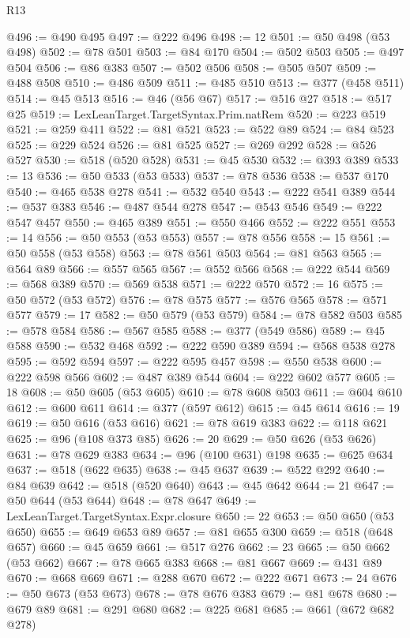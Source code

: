\begin{lexlean}{R13}
\begin{coremodule}
@496 := @490 @495
@497 := @222 @496
@498 := 12
@501 := @50 @498 (@53 @498)
@502 := @78 @501
@503 := @84 @170
@504 := @502 @503
@505 := @497 @504
@506 := @86 @383
@507 := @502 @506
@508 := @505 @507
@509 := @488 @508
@510 := @486 @509
@511 := @485 @510
@513 := @377 (@458 @511)
@514 := @45 @513
@516 := @46 (@56 @67)
@517 := @516 @27
@518 := @517 @25
@519 := LexLeanTarget.TargetSyntax.Prim.natRem
@520 := @223 @519
@521 := @259 @411
@522 := @81 @521
@523 := @522 @89
@524 := @84 @523
@525 := @229 @524
@526 := @81 @525
@527 := @269 @292
@528 := @526 @527
@530 := @518 (@520 @528)
@531 := @45 @530
@532 := @393 @389
@533 := 13
@536 := @50 @533 (@53 @533)
@537 := @78 @536
@538 := @537 @170
@540 := @465 @538 @278
@541 := @532 @540
@543 := @222 @541 @389
@544 := @537 @383
@546 := @487 @544 @278
@547 := @543 @546
@549 := @222 @547 @457
@550 := @465 @389
@551 := @550 @466
@552 := @222 @551
@553 := 14
@556 := @50 @553 (@53 @553)
@557 := @78 @556
@558 := 15
@561 := @50 @558 (@53 @558)
@563 := @78 @561 @503
@564 := @81 @563
@565 := @564 @89
@566 := @557 @565
@567 := @552 @566
@568 := @222 @544
@569 := @568 @389
@570 := @569 @538
@571 := @222 @570
@572 := 16
@575 := @50 @572 (@53 @572)
@576 := @78 @575
@577 := @576 @565
@578 := @571 @577
@579 := 17
@582 := @50 @579 (@53 @579)
@584 := @78 @582 @503
@585 := @578 @584
@586 := @567 @585
@588 := @377 (@549 @586)
@589 := @45 @588
@590 := @532 @468
@592 := @222 @590 @389
@594 := @568 @538 @278
@595 := @592 @594
@597 := @222 @595 @457
@598 := @550 @538
@600 := @222 @598 @566
@602 := @487 @389 @544
@604 := @222 @602 @577
@605 := 18
@608 := @50 @605 (@53 @605)
@610 := @78 @608 @503
@611 := @604 @610
@612 := @600 @611
@614 := @377 (@597 @612)
@615 := @45 @614
@616 := 19
@619 := @50 @616 (@53 @616)
@621 := @78 @619 @383
@622 := @118 @621
@625 := @96 (@108 @373 @85)
@626 := 20
@629 := @50 @626 (@53 @626)
@631 := @78 @629 @383
@634 := @96 (@100 @631) @198
@635 := @625 @634
@637 := @518 (@622 @635)
@638 := @45 @637
@639 := @522 @292
@640 := @84 @639
@642 := @518 (@520 @640)
@643 := @45 @642
@644 := 21
@647 := @50 @644 (@53 @644)
@648 := @78 @647
@649 := LexLeanTarget.TargetSyntax.Expr.closure
@650 := 22
@653 := @50 @650 (@53 @650)
@655 := @649 @653 @89
@657 := @81 @655 @300
@659 := @518 (@648 @657)
@660 := @45 @659
@661 := @517 @276
@662 := 23
@665 := @50 @662 (@53 @662)
@667 := @78 @665 @383
@668 := @81 @667
@669 := @431 @89
@670 := @668 @669
@671 := @288 @670
@672 := @222 @671
@673 := 24
@676 := @50 @673 (@53 @673)
@678 := @78 @676 @383
@679 := @81 @678
@680 := @679 @89
@681 := @291 @680
@682 := @225 @681
@685 := @661 (@672 @682 @278)

\end{coremodule}
\end{lexlean}
